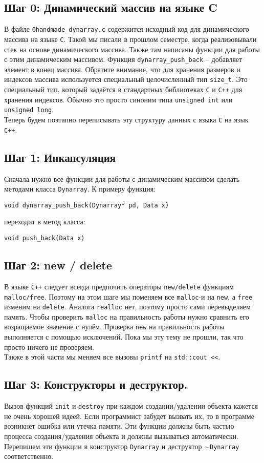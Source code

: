 \documentclass{article}
\begin{document}
\subsection*{Шаг 0: Динамический массив на языке C}
В файле \texttt{0handmade\_dynarray.c} содержится исходный код для динамического массива на языке \texttt{C}. Такой мы писали в прошлом семестре, когда реализовывали стек на основе динамического массива. Также там написаны функции для работы с этим динамическим массивом. Функция \texttt{dynarray\_push\_back} -- добавляет элемент в конец массива. Обратите внимание, что для хранения размеров и индексов массива используется специальный целочисленный тип \texttt{size\_t}. Это специальный тип, который задаётся в стандартных библиотеках \texttt{C} и \texttt{C++} для хранения индексов. Обычно это просто синоним типа \texttt{unsigned int} или \texttt{unsigned long}.\\
Теперь будем поэтапно переписывать эту структуру данных с языка \texttt{C} на язык \texttt{C++}.
\subsection*{Шаг 1: Инкапсуляция}
Сначала нужно все функции для работы с динамическим массивом сделать методами класса \texttt{Dynarray}. К примеру функция:
\begin{lstlisting}
void dynarray_push_back(Dynarray* pd, Data x)
\end{lstlisting}
переходит в метод класса:
\begin{lstlisting}
void push_back(Data x)
\end{lstlisting}
\subsection*{Шаг 2: new / delete}
В языке \texttt{C++} следует всегда предпочить операторы \texttt{new/delete} функциям \texttt{malloc/free}. Поэтому на этом шаге мы поменяем все \texttt{malloc}-и на \texttt{new}, а \texttt{free} изменим на \texttt{delete}. Аналога \texttt{realloc} нет, поэтому просто сами перевыделяем память. Чтобы проверить \texttt{malloc} на правильность работы нужно сравнить его возращаемое значение с нулём. Проверка \texttt{new} на правильность работы выполняется с помощью исключений. Пока мы эту тему не прошли, так что просто ничего не проверяем.
\\
Также в этой части мы меняем все вызовы \texttt{printf} на \texttt{std::cout <{}<}.

\subsection*{Шаг 3: Конструкторы и деструктор.}
Вызов функций \texttt{init} и \texttt{destroy} при каждом создании/удалении объекта кажется не очень хорошей идеей. Если программист забудет вызвать их, то в программе возникнет ошибка или утечка памяти. Эти функции должны быть частью процесса создания/удаления объекта и должны вызываться автоматически. Перепишем эти функции в конструктор \texttt{Dynarray} и деструктор \texttt{$\sim$Dynarray} соответственно.
\end{document}
